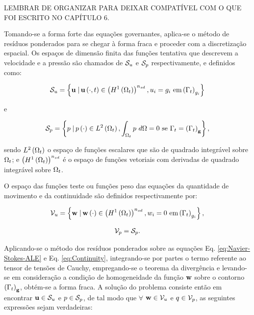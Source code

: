 \documentclass[tese_patricia]{subfiles}%
\begin{document}
LEMBRAR DE ORGANIZAR PARA DEIXAR COMPATÍVEL COM O QUE FOI ESCRITO NO CAPÍTULO 6.

Tomando-se a forma forte das equações governantes, aplica-se o método de resíduos ponderados para se chegar à forma fraca e proceder com a discretização espacial. Os espaços de dimensão finita das funções tentativa que descrevem a velocidade e a pressão são chamados de $\mathcal{S}_u$ e $\mathcal{S}_p$ respectivamente, e definidos como:

\begin{align}
\mathcal{S}_u = \left\{\mathbf{u} \left . \right| \mathbf{u} \left(\cdot,t\right) \in \left(H^{1}\left(\Omega_t\right)\right)^{n_{sd}}, u_{i} = g_{i} \textrm { em} \left(\Gamma_{t}\right)_{g_i} \right\}
\end{align}

\noindent e

\begin{align}
\mathcal{S}_p = \left\{p \left . \right| p \left(\cdot\right) \in L^{2}\left(\Omega_t\right), \int_{\Omega_t}p \textrm { } d\Omega = 0 \textrm { se } \Gamma_{t} =\left(\Gamma_{t}\right)_{\mathbf{g}} \right\},
\end{align}

\noindent sendo $L^{2}\left(\Omega_t\right)$ o espaço de funções escalares que são de quadrado integrável sobre $\Omega_t$; e $\left(H^{1}\left(\Omega_t\right)\right)^{n_{sd}}$ é o espaço de funções vetoriais com derivadas de quadrado integrável sobre $\Omega_t$.

O espaço das funções teste ou funções peso das equações da quantidade de movimento e da continuidade são definidos respectivamente por:

\begin{align}
\mathcal{V}_u = \left\{\mathbf{w} \left . \right| \mathbf{w} \left(\cdot\right) \in \left(H^{1}\left(\Omega_t\right)\right)^{n_{sd}}, w_{i} = 0 \textrm { em} \left(\Gamma_{t}\right)_{g_i} \right\},
\end{align}


\begin{align}
\mathcal{V}_p = \mathcal{S}_p.
\end{align}

Aplicando-se o método dos resíduos ponderados sobre as equações Eq. \eqref{eq:Navier-Stokes-ALE} e Eq. \eqref{eq:Continuity}, integrando-se por partes o termo referente ao tensor de tensões de Cauchy, empregando-se o teorema da divergência e levando-se em consideração a condição de homogeneidade da função $\mathbf{w}$ sobre o contorno $\left(\Gamma_{t}\right)_{\mathbf{g}}$, obtém-se a forma fraca. A solução do problema consiste então em encontrar $\mathbf{u} \in \mathcal{S}_u$ e $p \in \mathcal{S}_p$, de tal modo que $\forall$ $\mathbf{w} \in \mathcal{V}_u$ e $q \in \mathcal{V}_p$, as seguintes expressões sejam verdadeiras:
\end{document}
